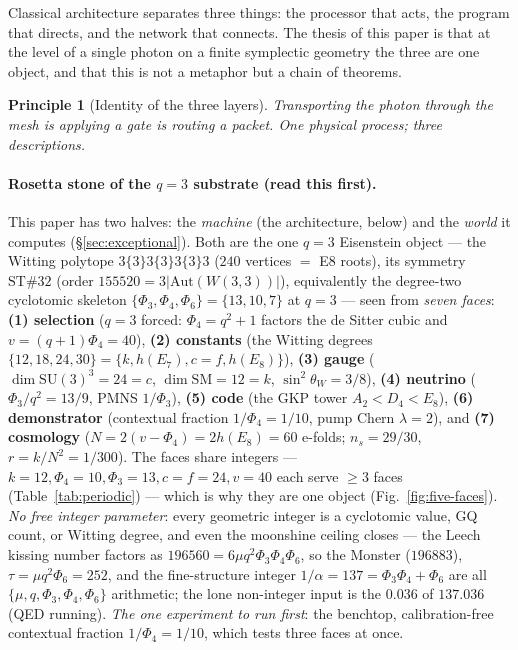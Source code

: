 \documentclass[11pt]{article}
\newtheorem{principle}[theorem]{Principle}
\newcommand{\W}{W(3,3)}
\begin{document}
Classical architecture separates three things: the processor that acts,
the program that directs, and the network that connects.  The thesis of
this paper is that at the level of a single photon on a finite
symplectic geometry the three are one object, and that this is not a
metaphor but a chain of theorems.

\begin{principle}[Identity of the three layers]
Transporting the photon through the mesh \emph{is} applying a gate
\emph{is} routing a packet.  One physical process; three descriptions.
\end{principle}

\paragraph{Rosetta stone of the $q=3$ substrate (read this first).} This paper has two
halves: the \emph{machine} (the architecture, below) and the \emph{world} it computes
(\S\ref{sec:exceptional}). Both are the one $q=3$ Eisenstein object --- the Witting
polytope $3\{3\}3\{3\}3\{3\}3$ ($240$ vertices $=$ E8 roots), its symmetry
$\mathrm{ST}\#32$ (order $155520=3\lvert\mathrm{Aut}(\W)\rvert$), equivalently the
degree-two cyclotomic skeleton $\{\Phi_3,\Phi_4,\Phi_6\}=\{13,10,7\}$ at $q=3$ --- seen
from \emph{seven faces}: \textbf{(1) selection} ($q=3$ forced: $\Phi_4=q^2+1$ factors the
de Sitter cubic and $v=(q{+}1)\Phi_4=40$), \textbf{(2) constants} (the Witting degrees
$\{12,18,24,30\}=\{k,h(E_7),c{=}f,h(E_8)\}$), \textbf{(3) gauge} ($\dim\mathrm{SU}(3)^3=24=c$,
$\dim\mathrm{SM}=12=k$, $\sin^2\theta_W=3/8$), \textbf{(4) neutrino} ($\Phi_3/q^2=13/9$,
PMNS $1/\Phi_3$), \textbf{(5) code} (the GKP tower $A_2{<}D_4{<}E_8$), \textbf{(6)
demonstrator} (contextual fraction $1/\Phi_4=1/10$, pump Chern $\lambda=2$), and
\textbf{(7) cosmology} ($N=2(v{-}\Phi_4)=2h(E_8)=60$ e-folds; $n_s=29/30$, $r=k/N^2=1/300$).
The faces share integers --- $k{=}12,\Phi_4{=}10,\Phi_3{=}13,c{=}f{=}24,v{=}40$ each serve
$\ge3$ faces (Table~\ref{tab:periodic}) --- which is why they are one object
(Fig.~\ref{fig:five-faces}). \emph{No free integer parameter}: every geometric integer is a cyclotomic value, GQ
count, or Witting degree, and even the moonshine ceiling closes --- the Leech kissing
number factors as $196560=6\mu q^2\Phi_3\Phi_4\Phi_6$, so the Monster ($196883$),
$\tau=\mu q^2\Phi_6=252$, and the fine-structure integer $1/\alpha=137=\Phi_3\Phi_4+
\Phi_6$ are all $\{\mu,q,\Phi_3,\Phi_4,\Phi_6\}$ arithmetic; the lone non-integer input
is the $0.036$ of $137.036$ (QED running). \emph{The one experiment to run first}: the
benchtop, calibration-free contextual fraction $1/\Phi_4=1/10$, which tests three faces
at once.
\end{document}
